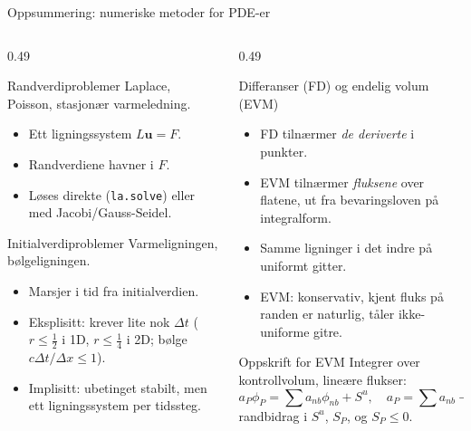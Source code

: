 \documentclass[11pt,aspectratio=169]{beamer}
\begin{document}
\begin{frame}{Oppsummering: numeriske metoder for PDE-er}
\begin{columns}[t]
\begin{column}{0.49\textwidth}
\footnotesize
\begin{oppsumb}{Randverdiproblemer}
Laplace, Poisson, stasjonær varmeledning.
\begin{itemize}
\item Ett ligningssystem $L\mathbf u = F$.
\item Randverdiene havner i $F$.
\item Løses direkte (\texttt{la.solve}) eller med Jacobi/Gauss-Seidel.
\end{itemize}
\end{oppsumb}
\begin{oppsumb}{Initialverdiproblemer}
Varmeligningen, bølgeligningen.
\begin{itemize}
\item Marsjer i tid fra initialverdien.
\item Eksplisitt: krever lite nok $\Delta t$ ($r\le\frac12$ i 1D, $r\le\frac14$ i 2D; bølge $c\Delta t/\Delta x\le1$).
\item Implisitt: ubetinget stabilt, men ett ligningssystem per tidssteg.
\end{itemize}
\end{oppsumb}
\end{column}
\begin{column}{0.49\textwidth}
\footnotesize
\begin{oppsumb}{Differanser (FD) og endelig volum (EVM)}
\begin{itemize}
\item FD tilnærmer \emph{de deriverte} i punkter.
\item EVM tilnærmer \emph{fluksene} over flatene, ut fra bevaringsloven på integralform.
\item Samme ligninger i det indre på uniformt gitter.
\item EVM: konservativ, kjent fluks på randen er naturlig, tåler ikke-uniforme gitre.
\end{itemize}
\end{oppsumb}
\begin{oppsumb}{Oppskrift for EVM}
Integrer over kontrollvolum, lineære flukser:
\vspace{-1mm}\[
a_P\phi_P = \textstyle\sum a_{nb}\phi_{nb} + S^u,\quad a_P = \sum a_{nb} - S_P,
\]
randbidrag i $S^u$, $S_P$, og $S_P\le0$.
\end{oppsumb}
\end{column}
\end{columns}
\end{frame}
\end{document}

